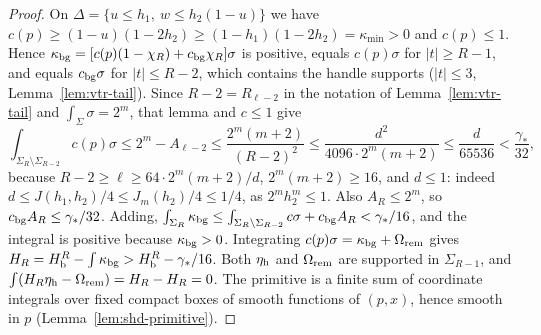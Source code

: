 \begin{proof}
On $\Delta=\{u\le h_1,\ w\le h_2(1-u)\}$ we have $c(p)\ge(1-u)(1-2h_2)\ge(1-h_1)(1-2h_2)=\kappa_{\min}>0$ and $c(p)\le1$. Hence
$\kappa_{\rm bg}=[c(p)(1-\chi_R)+c_{\rm bg}\chi_R]\sigma$ is positive, equals $c(p)\sigma$ for $|t|\ge R-1$, and equals $c_{\rm bg}\sigma$ for
$|t|\le R-2$, which contains the handle supports ($|t|\le3$, Lemma~\ref{lem:vtr-tail}). Since $R-2=R_{\ell-2}$ in the notation
of Lemma~\ref{lem:vtr-tail} and $\int_\Sigma\sigma=2^m$, that lemma and $c\le1$ give
\[
 \int_{\Sigma_R\setminus\Sigma_{R-2}}c(p)\sigma\le2^m-A_{\ell-2}
 \le\frac{2^m(m+2)}{(R-2)^2}\le\frac{d^2}{4096\cdot2^m(m+2)}\le\frac d{65536}<\frac{\gamma_*}{32},
\]
because $R-2\ge\ell\ge64\cdot2^m(m+2)/d$, $2^m(m+2)\ge16$, and $d\le1$: indeed
$d\le J(h_1,h_2)/4\le J_m(h_2)/4\le1/4$, as $2^mh_2^m\le1$. Also $A_R\le2^m$, so $c_{\rm bg}A_R\le\gamma_*/32$. Adding,
$\int_{\Sigma_R}\kappa_{\rm bg}\le\int_{\Sigma_R\setminus\Sigma_{R-2}}c\sigma+c_{\rm bg}A_R<\gamma_*/16$, and the integral is positive because
$\kappa_{\rm bg}>0$. Integrating $c(p)\sigma=\kappa_{\rm bg}+\Omega_{\rm rem}$ gives $H_R=H_{\mathrm b}^R-\int\kappa_{\rm bg}>H_{\mathrm b}^R-\gamma_*/16$.
Both $\eta_{\rm h}$ and $\Omega_{\rm rem}$ are supported in $\Sigma_{R-1}$, and $\int(H_R\eta_{\rm h}-\Omega_{\rm rem})=H_R-H_R=0$.
The primitive is a finite sum of coordinate integrals over fixed compact boxes of smooth functions of $(p,x)$, hence
smooth in $p$ (Lemma~\ref{lem:shd-primitive}).
\end{proof}
